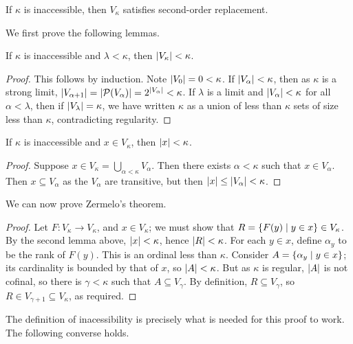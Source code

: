 \begin{theorem}[Zermelo]
    If \( \kappa \) is inaccessible, then \( V_\kappa \) satisfies second-order replacement.
\end{theorem}
We first prove the following lemmas.
\begin{lemma}
    If \( \kappa \) is inaccessible and \( \lambda < \kappa \), then \( \abs{V_\kappa} < \kappa \).
\end{lemma}
\begin{proof}
    This follows by induction.
    Note \( \abs{V_0} = 0 < \kappa \).
    If \( \abs{V_\alpha} < \kappa \), then as \( \kappa \) is a strong limit, \( \abs{V_{\alpha + 1}} = \abs{\mathcal P(V_\alpha)} = 2^{\abs{V_\alpha}} < \kappa \).
    If \( \lambda \) is a limit and \( \abs{V_\alpha} < \kappa \) for all \( \alpha < \lambda \), then if \( \abs{V_\lambda} = \kappa \), we have written \( \kappa \) as a union of less than \( \kappa \) sets of size less than \( \kappa \), contradicting regularity.
\end{proof}
\begin{lemma}
    If \( \kappa \) is inaccessible and \( x \in V_\kappa \), then \( \abs{x} < \kappa \).
\end{lemma}
\begin{proof}
    Suppose \( x \in V_\kappa = \bigcup_{\alpha < \kappa} V_\alpha \).
    Then there exists \( \alpha < \kappa \) such that \( x \in V_\alpha \).
    Then \( x \subseteq V_\alpha \) as the \( V_\alpha \) are transitive, but then \( \abs{x} \leq \abs{V_\alpha} < \kappa \).
\end{proof}
We can now prove Zermelo's theorem.
\begin{proof}
    Let \( F : V_\kappa \to V_\kappa \), and \( x \in V_\kappa \); we must show that \( R = \qty{F(y) \mid y \in x} \in V_\kappa \).
    By the second lemma above, \( \abs{x} < \kappa \), hence \( \abs{R} < \kappa \).
    For each \( y \in x \), define \( \alpha_y \) to be the rank of \( F(y) \).
    This is an ordinal less than \( \kappa \).
    Consider \( A = \qty{\alpha_y \mid y \in x} \); its cardinality is bounded by that of \( x \), so \( \abs{A} < \kappa \).
    But as \( \kappa \) is regular, \( \abs{A} \) is not cofinal, so there is \( \gamma < \kappa \) such that \( A \subseteq V_\gamma \).
    By definition, \( R \subseteq V_\gamma \), so \( R \in V_{\gamma + 1} \subseteq V_\kappa \), as required.
\end{proof}
The definition of inacessibility is precisely what is needed for this proof to work.
The following converse holds.
